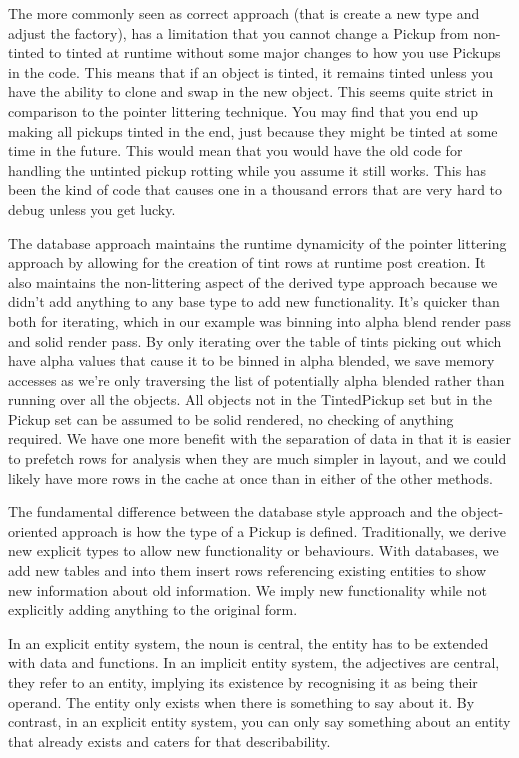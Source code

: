 The more commonly seen as correct approach (that is create a new type and
adjust the factory), has a limitation that you cannot change a Pickup from
non-tinted to tinted at runtime without some major changes to how you use
Pickups in the code. This means that if an object is tinted, it remains tinted
unless you have the ability to clone and swap in the new object.  This seems
quite strict in comparison to the pointer littering technique. You may find
that you end up making all pickups tinted in the end, just because they might
be tinted at some time in the future. This would mean that you would have the
old code for handling the untinted pickup rotting while you assume it still
works. This has been the kind of code that causes one in a thousand errors that
are very hard to debug unless you get lucky.

The database approach maintains the runtime dynamicity of the pointer littering
approach by allowing for the creation of tint rows at runtime post creation.
It also maintains the non-littering aspect of the derived type approach because
we didn't add anything to any base type to add new functionality.  It's quicker
than both for iterating, which in our example was binning into alpha blend
render pass and solid render pass. By only iterating over the table of tints picking out
which have alpha values that cause it to be binned in alpha blended, we save
memory accesses as we're only traversing the list of potentially alpha blended
rather than running over all the objects. All objects not in the TintedPickup
set but in the Pickup set can be assumed to be solid rendered, no checking of
anything required. We have one more benefit with the separation of data in that
it is easier to prefetch rows for analysis when they are much simpler in
layout, and we could likely have more rows in the cache at once than in either
of the other methods.

The fundamental difference between the database style approach and the
object-oriented approach is how the type of a Pickup is defined. Traditionally,
we derive new explicit types to allow new functionality or behaviours. With
databases, we add new tables and into them insert rows referencing existing
entities to show new information about old information. We imply new
functionality while not explicitly adding anything to the original form.

In an explicit entity system, the noun is central, the entity has to be
extended with data and functions. In an implicit entity system, the adjectives
are central, they refer to an entity, implying its existence by recognising it
as being their operand. The entity only exists when there is something to say
about it. By contrast, in an explicit entity system, you can only say something
about an entity that already exists and caters for that describability.

